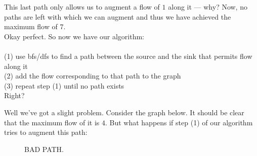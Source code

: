 \documentclass[11pt]{article}
\theoremstyle{plain}
\theoremstyle{definition}
\begin{document}
\noindent This last path only allows us to augment a flow of $1$ along it --- why? Now, no paths are left with which we can augment and thus we have achieved the maximum flow of $7$.\\

\noindent Okay perfect. So now we have our algorithm:
\\\\
\noindent (1) use bfs/dfs to find a path between the source and the sink that permits flow along it\\
(2) add the flow corresponding to that path to the graph\\
(3) repeat step (1) until no path exists\\

\noindent Right?
\newpage

\noindent Well we've got a slight problem. Consider the graph below. It should be clear that the maximum flow of it is $4$. But what happens if step (1) of our algorithm tries to augment this path:

\begin{figure}[!ht]
\label{fig:bad}
\caption{BAD PATH.}
\centering
{}
\end{figure}
\end{document}
